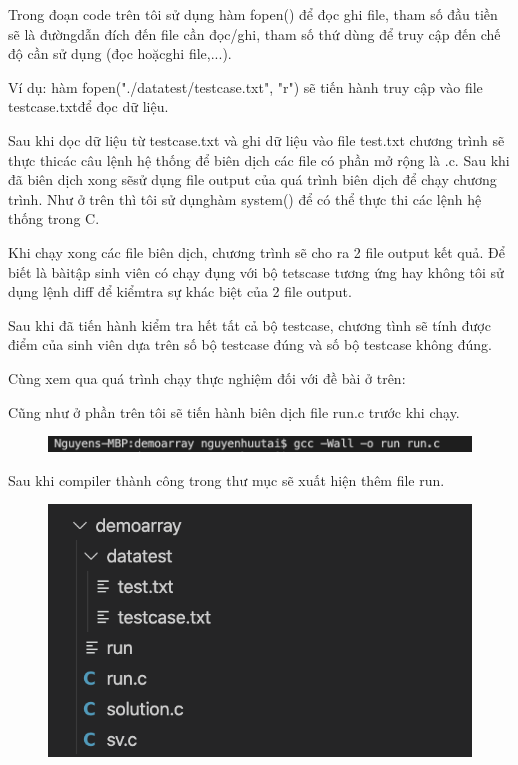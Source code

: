 \documentclass[12pt,a4paper]{article}
\begin{document}
Trong đoạn code trên tôi sử dụng hàm fopen() để đọc ghi file, tham số đầu tiền sẽ là đườngdẫn đích đến file cần đọc/ghi, tham số thứ dùng để truy cập đến chế độ cần sử dụng (đọc hoặcghi file,...).

Ví dụ: hàm fopen("./datatest/testcase.txt", "r") sẽ tiến hành truy cập vào file testcase.txtđể đọc dữ liệu.

Sau khi dọc dữ liệu từ testcase.txt và ghi dữ liệu vào file test.txt chương trình sẽ thực thicác câu lệnh hệ thống để biên dịch các file có phần mở rộng là .c. Sau khi đã biên dịch xong sẽsử dụng file output của quá trình biên dịch để chạy chương trình. Như ở trên thì tôi sử dụnghàm system() để có thể thực thi các lệnh hệ thống trong C.

Khi chạy xong các file biên dịch, chương trình sẽ cho ra 2 file output kết quả. Để biết là bàitập sinh viên có chạy đụng với bộ tetscase tương ứng hay không tôi sử dụng lệnh diff để kiểmtra sự khác biệt của 2 file output.

Sau khi đã tiến hành kiểm tra hết tất cả bộ testcase, chương tình sẽ tính được điểm của sinh viên dựa trên số bộ testcase đúng và số bộ testcase không đúng.

Cùng xem qua quá trình chạy thực nghiệm đối với đề bài ở trên:

Cũng như ở phần trên tôi sẽ tiến hành biên dịch file run.c trước khi chạy.

\begin{figure}[ht]
\begin{center}
\includegraphics[scale=.3]{hinhanh/compilerdemoarray.png}
\end{center}
\end{figure}

Sau khi compiler thành công trong thư mục sẽ xuất hiện thêm file run.

\begin{figure}[ht]
\begin{center}
\includegraphics[scale=.3]{hinhanh/cautrucarraysaucompiler.png}
\end{center}
\end{figure}
\end{document}
